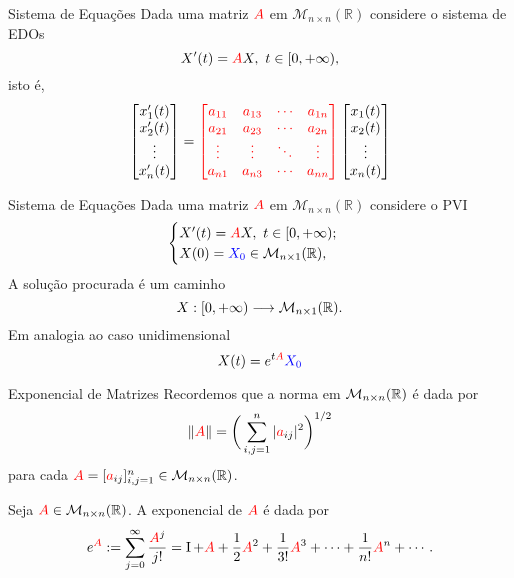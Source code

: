 \begin{frame}{Sistema de Equações}
Dada uma matriz ${\color{red}A}$ em $\mathcal M _{n\times n} (\mathbb R )$ considere o sistema de EDOs
\[
    X'(t)=\rA X,\ t\in [0,+\infty),
\]
isto é,
\[
\begin{bmatrix}
x_1'(t)\\ x_2'(t)\\ \vdots \\ x_n'(t)
\end{bmatrix}
={\color{red}\begin{bmatrix}
a_{11} & a_{13} & \cdots & a_{1n}\\
a_{21} & a_{23} & \cdots & a_{2n}\\
\vdots & \vdots & \ddots & \vdots\\
a_{n1} & a_{n3} & \cdots & a_{nn}
\end{bmatrix}}
\begin{bmatrix}
x_1(t)\\ x_2(t)\\ \vdots \\ x_n(t)
\end{bmatrix}
\]

\end{frame}


\begin{frame}{Sistema de Equações}
Dada uma matriz ${\color{red}A}$ em $\mathcal M _{n\times n} (\mathbb R )$ considere o PVI
\[
\begin{cases}
    X'(t)={\color{red}A} X,\ t\in [0,+\infty);\\
    X(0)={\color{blue}X_0} \in \mathcal M_{n\times 1} (\mathbb{R} ),
\end{cases}
\]
A solução procurada é um caminho 
\[
X: [0,+\infty) \longrightarrow   \mathcal M _{n\times 1} (\mathbb{R} ).
\]
Em analogia ao caso unidimensional
\[
X(t)=e^{t{\color{red}A}}{\color{blue}X_0} 
\]
\end{frame}


\begin{frame}{Exponencial de Matrizes}
Recordemos que a norma em $\mathcal M_{n\times n} (\mathbb{R})$ é dada por
\[
\|{\color{red}A}\|=\bigg( \sum_{i,j=1}^{n} |{\color{red}a}_{ij}|^2 \bigg)^{1/2}
\]
para cada ${\color{red}A}=[{\color{red}a}_{ij}]_{i,j=1}^{n} \in \mathcal M_{n\times n} (\mathbb{R})$. 

\begin{definition}\label{expmatrix}
    Seja ${\color{red}A}\in \mathcal M_{n\times n} (\mathbb{R})$. A {\color{blue}exponencial de} ${\color{red}A}$ é dada por
    \begin{equation}\label{exp}
    \displaystyle e^{{\color{red}A}}:=\sum_{j=0}^{\infty} \frac{{\color{red}A}^j}{j!}=\operatorname{I} + {\color{red}A} + \frac{1}{2}{\color{red}A}^2+\frac{1}{3!}{\color{red}A}^3+\cdots+\frac{1}{n!}{\color{red}A}^n+\cdots . 
    \end{equation}
\end{definition}
\end{frame}

